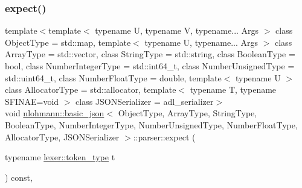 \subsubsection{\texorpdfstring{expect()}{expect()}}
{\footnotesize\ttfamily template$<$template$<$ typename U, typename V, typename... Args $>$ class Object\+Type = std\+::map, template$<$ typename U, typename... Args $>$ class Array\+Type = std\+::vector, class String\+Type  = std\+::string, class Boolean\+Type  = bool, class Number\+Integer\+Type  = std\+::int64\+\_\+t, class Number\+Unsigned\+Type  = std\+::uint64\+\_\+t, class Number\+Float\+Type  = double, template$<$ typename U $>$ class Allocator\+Type = std\+::allocator, template$<$ typename T, typename S\+F\+I\+N\+A\+E=void $>$ class J\+S\+O\+N\+Serializer = adl\+\_\+serializer$>$ \\
void \hyperlink{classnlohmann_1_1basic__json}{nlohmann\+::basic\+\_\+json}$<$ Object\+Type, Array\+Type, String\+Type, Boolean\+Type, Number\+Integer\+Type, Number\+Unsigned\+Type, Number\+Float\+Type, Allocator\+Type, J\+S\+O\+N\+Serializer $>$\+::parser\+::expect (\begin{DoxyParamCaption}\item[{typename \hyperlink{classnlohmann_1_1basic__json_1_1lexer_a96887d6cd131e3d3a85a9d71fbdbcdf7}{lexer\+::token\+\_\+type}}]{t }\end{DoxyParamCaption}) const\hspace{0.3cm}{\ttfamily [inline]}, {\ttfamily [private]}}

\mbox{\label{classnlohmann_1_1basic__json_1_1parser_ab00b85e650dc89c39ae02539ec5f41d4}} 
